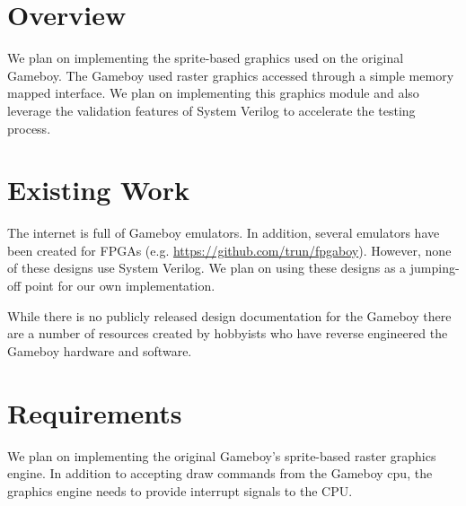 \documentclass{article}
\begin{document}
\newenvironment{frcseries}{\fontfamily{frc}\selectfont}{}
\newcommand{\textfrc}[1]{{\frcseries#1}}
\newcommand{\mathfrc}[1]{\text{\textfrc{#1}}}




\section{Overview}
We plan on implementing the sprite-based graphics used on
the original Gameboy. The Gameboy used raster graphics
accessed through a simple memory mapped interface. We
plan on implementing this graphics module and also
leverage the validation features of System Verilog to 
accelerate the testing process.

\section{Existing Work}
The internet is full of Gameboy emulators. In addition, several
emulators have been created for FPGAs (e.g.
\url{https://github.com/trun/fpgaboy}). However, none of these designs
use System Verilog. We plan on using these designs as a jumping-off
point for our own implementation.

While there is no publicly released design documentation for the 
Gameboy there are a number of resources created by hobbyists who 
have reverse engineered the Gameboy hardware and software.

\section{Requirements}

We plan on implementing the original Gameboy's sprite-based raster
graphics engine. In addition to accepting draw commands from the
Gameboy cpu, the graphics engine needs to provide interrupt signals to
the CPU. 
\end{document}
